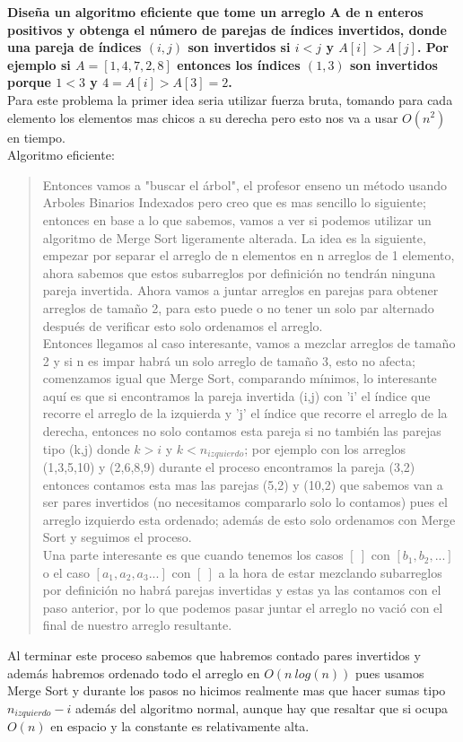 \textbf{Diseña un algoritmo eficiente que tome un arreglo A de n enteros positivos y obtenga el número de parejas de índices invertidos, donde una pareja de índices $(i,j)$ son invertidos si $i<j$ y $A[i] > A[j]$. Por ejemplo si $A=[1,4,7,2,8]$ entonces los índices $(1,3)$ son invertidos porque $1<3$ y $4=A[i]>A[3]=2$.}\\

Para este problema la primer idea seria utilizar fuerza bruta, tomando para cada elemento los elementos mas chicos a su derecha pero esto nos va a usar $O(n^2)$ en tiempo.\\

\textcolor{bibi}{Algoritmo eficiente:}
\begin{quote}
    Entonces vamos a "buscar el árbol", el profesor enseno un método usando Arboles Binarios Indexados pero creo que es mas sencillo lo siguiente; entonces en base a lo que sabemos, vamos a ver si podemos utilizar un algoritmo de Merge Sort ligeramente alterada. La idea es la siguiente, empezar por separar el arreglo de n elementos en n arreglos de 1 elemento, ahora sabemos que estos subarreglos por definición no tendrán ninguna pareja invertida. Ahora vamos a juntar arreglos en parejas para obtener arreglos de tamaño 2, para esto puede o no tener un solo par alternado después de verificar esto solo ordenamos el arreglo. \\
    
    Entonces llegamos al caso interesante, vamos a mezclar arreglos de tamaño 2 y si n es impar habrá un solo arreglo de tamaño 3, esto no afecta; comenzamos igual que Merge Sort, comparando mínimos, lo interesante aquí es que si encontramos la pareja invertida (i,j) con 'i' el índice que recorre el arreglo de la izquierda y 'j' el índice que recorre el arreglo de la derecha, entonces no solo contamos esta pareja si no también las parejas tipo (k,j) donde $k>i$ y $k<n_{izquierdo}$; por ejemplo con los arreglos (1,3,5,10) y (2,6,8,9) durante el proceso encontramos la pareja (3,2) entonces contamos esta mas las parejas (5,2) y (10,2) que sabemos van a ser pares invertidos (no necesitamos compararlo solo lo contamos) pues el arreglo izquierdo esta ordenado; además de esto solo ordenamos con Merge Sort y seguimos el proceso.\\
    
    Una parte interesante es que cuando tenemos los casos $[\ ]$ con $[b_{1},b_{2},...]$ o el caso $[a_{1},a_{2},a_{3}...]$ con $[\ ]$ a la hora de estar mezclando subarreglos por definición no habrá parejas invertidas y estas ya las contamos con el paso anterior, por lo que podemos pasar juntar el arreglo no vació con el final de nuestro arreglo resultante.
\end{quote}

Al terminar este proceso sabemos que habremos contado pares invertidos y además habremos ordenado todo el arreglo en $O(n \ log(n))$ pues usamos Merge Sort y durante los pasos no hicimos realmente mas que hacer sumas tipo $n_{izquierdo} - i$ además del algoritmo normal, aunque hay que resaltar que si ocupa $O(n)$ en espacio y la constante es relativamente alta.\\